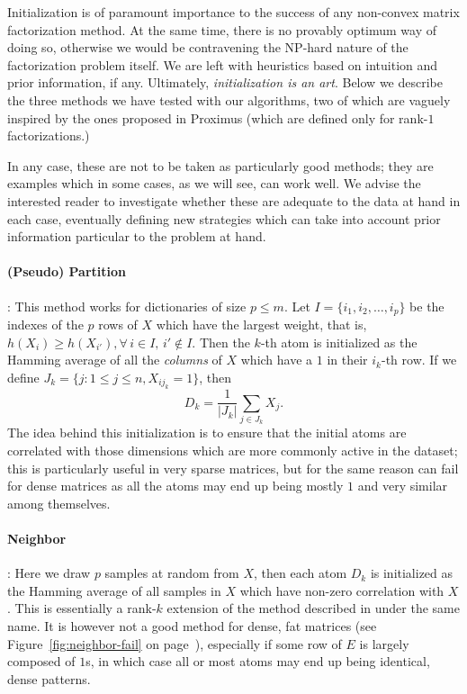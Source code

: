 \documentclass[twocolumn]{IEEEtran}
\theoremstyle{definition}
\begin{document}
Initialization is of paramount importance to the success of any non-convex matrix factorization method. At the same time, there is no provably optimum way of doing so, otherwise we would be contravening the NP-hard nature of the factorization problem itself. We are left with heuristics based on intuition and prior information, if any. Ultimately, \emph{initialization is an art}. Below we describe the three methods we have tested with our algorithms, two of which are vaguely inspired by the ones proposed in Proximus (which are defined only for rank-$1$ factorizations.)

In any case, these are not to be taken as particularly good methods; they are examples which in some cases, as we will see, can work well. We advise the interested reader to investigate whether these are adequate to the data at hand in each case, eventually defining new strategies which can take into account prior information particular to the problem at hand. 

\paragraph{(Pseudo) Partition}: This method works for dictionaries of size $p \leq m$. Let $I=\{i_1,i_2,\ldots,i_p\}$ be the indexes of the $p$ rows of $X$ which have the largest weight, that is, $h(X_i) \geq h(X_{i'}),\forall\,i\in{I},\,i' \notin{I}$. Then the $k$-th atom is initialized as the Hamming average of all the \emph{columns} of $X$ which have a $1$ in their $i_k$-th row. If we define $J_k=\{j:1 \leq j \leq n, X_{ij_k}=1 \}$, then $$D_k = \frac{1}{|J_k|}\sum_{j \in J_k} X_j.$$ 
The idea behind this initialization is to ensure that the initial atoms are correlated with those dimensions which are more commonly active in the dataset; this is particularly useful in very sparse matrices, but for the same reason can fail for dense matrices as all the atoms may end up being mostly $1$ and very similar among themselves.
 
\paragraph{Neighbor}: Here we draw $p$ samples at random from $X$, then each atom $D_k$ is initialized as the Hamming average of all samples in $X$ which have non-zero correlation with $X$. This is essentially a rank-$k$ extension of the method described in \cite{proximus} under the same name. It is however not a good method for dense, fat matrices (see Figure~\ref{fig:neighbor-fail} on page~\pageref{fig:neighbor-fail}), especially if some row of $E$ is largely composed of $1$s, in which case all or most atoms may end up being identical, dense patterns.
\end{document}
